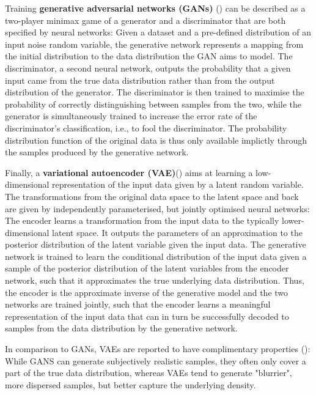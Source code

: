 Training \textbf{generative adversarial networks (GANs)} (\cite{Goodfellow2014}) can be described as a two-player minimax game of a generator and a discriminator that are both specified by neural networks: Given a dataset and a pre-defined distribution of an input noise random variable, the generative network represents a mapping from the initial distribution to the data distribution the GAN aims to model. The discriminator, a second neural network, outputs the probability that a given input came from the true data distribution rather than from the output distribution of the generator. The discriminator is then trained to maximise the probability of correctly distinguishing between samples from the two, while the generator is simultaneously trained to increase the error rate of the discriminator's classification, i.e., to fool the discriminator. 
The probability distribution function of the original data is thus only available implictly through the samples produced by the generative network.

Finally, a \textbf{variational autoencoder (VAE)}(\cite{Kingma2013}) aims at learning a low-\\
dimensional representation of the input data given by a latent random variable. The transformations from the original data space to the latent space and back are given by independently parameterised, but jointly optimised neural networks: The encoder learns a transformation from the input data to the typically lower-dimensional latent space. It outputs the parameters of an approximation to the posterior distribution of the latent variable given the input data. The generative network is trained to learn the conditional distribution of the input data given a sample of the posterior distribution of the latent variables from the encoder network, such that it approximates the true underlying data distribution. Thus, the encoder is the approximate inverse of the generative model and the two networks are trained jointly, such that the encoder learns a meaningful representation of the input data that can in turn be successfully decoded to samples from the data distribution by the generative network. 

In comparison to GANs, VAEs are reported to have complimentary properties (\cite[p.~5]{Kingma2019}): While GANS can generate subjectively realistic samples, they often only cover a part of the true data distribution, whereas VAEs tend to generate "blurrier", more dispersed samples, but better capture the underlying density. 

